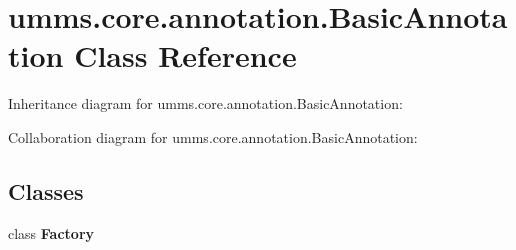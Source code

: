 \hypertarget{classumms_1_1core_1_1annotation_1_1_basic_annotation}{\section{umms.\+core.\+annotation.\+Basic\+Annotation Class Reference}
\label{classumms_1_1core_1_1annotation_1_1_basic_annotation}
}


Inheritance diagram for umms.\+core.\+annotation.\+Basic\+Annotation\+:


Collaboration diagram for umms.\+core.\+annotation.\+Basic\+Annotation\+:
\subsection*{Classes}
\begin{DoxyCompactItemize}
\item 
class {\bfseries Factory}
\end{DoxyCompactItemize}

